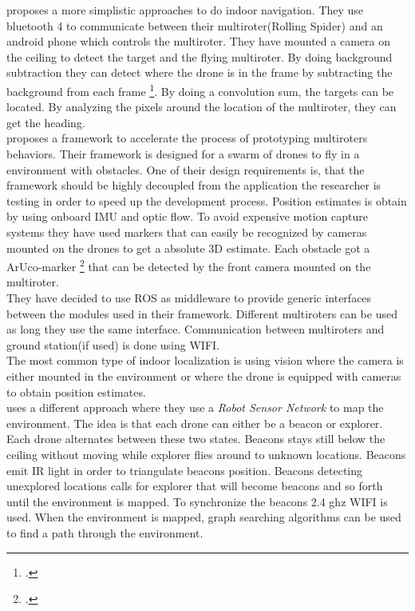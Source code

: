  
\cite{kang2015indoor} proposes a more simplistic approaches to do indoor navigation.
They use bluetooth 4 to communicate between their multiroter(Rolling Spider) and an android phone which controls the multiroter.
They have mounted a camera on the ceiling to detect the target and the flying multiroter.
By doing background subtraction they can detect where the drone is in the frame by subtracting the background from each frame \footcite{wikiBackgroundsubtraction}. 
By doing a convolution sum, the targets can be located. By analyzing the pixels around the location of the multiroter, they can get the heading. \\

\cite{sanchez2014system} proposes a framework to accelerate the process of prototyping multiroters behaviors. Their framework is designed for a swarm of drones to fly in a environment with obstacles. One of their design requirements is, that the framework should be highly decoupled from the application the researcher is testing in order to speed up the development process. 
Position estimates is obtain by using onboard IMU and optic flow. To avoid expensive motion capture systems they have used markers that can easily be recognized by cameras mounted on the drones to get a absolute 3D estimate. Each obstacle got a ArUco-marker \footcite{Aruco2014} that can be detected by the front camera mounted on the multiroter. \\
They have decided to use ROS as middleware to provide generic interfaces between the modules used in their framework. Different multiroters can be used as long they use the same interface. Communication between multiroters and ground station(if used) is done using WIFI. \\


The most common type of indoor localization is using vision where the camera is either mounted in the environment or where the drone is equipped with cameras to obtain position estimates.\\
\cite{stirling2012indoor} uses a different approach where they use a \textit{Robot Sensor Network} to map the environment.
The idea is that each drone can either be a beacon or explorer. Each drone alternates between these two states. Beacons stays still below the ceiling without moving while explorer flies around to unknown locations. Beacons emit IR light in order to triangulate beacons position.  Beacons detecting unexplored locations calls for explorer that will become beacons and so forth until the environment is mapped. To synchronize the beacons 2.4 ghz WIFI is used. When the environment is mapped, graph searching algorithms can be used to find a path through the environment.